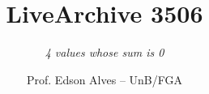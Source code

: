 \title{LiveArchive 3506}
\subtitle{{\it 4 values whose sum is 0}}
\author{Prof. Edson Alves -- UnB/FGA}
\date{}

